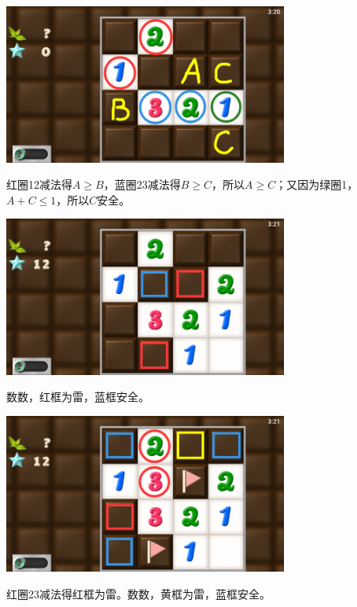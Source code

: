 \subsection{} %
\begin{center}
    \includegraphics[width=0.7\textwidth]{puzzle/156-1.png}
\end{center}
红圈12减法得$A\ge B$，蓝圈23减法得$B\ge C$，所以$A\ge C$；又因为绿圈1，$A+C\le 1$，所以$C$安全。
\begin{center}
    \includegraphics[width=0.7\textwidth]{puzzle/156-2.png}
\end{center}
数数，红框为雷，蓝框安全。
\begin{center}
    \includegraphics[width=0.7\textwidth]{puzzle/156-3.png}
\end{center}
红圈23减法得红框为雷。数数，黄框为雷，蓝框安全。

